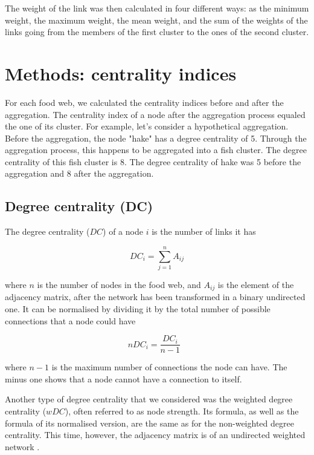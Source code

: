 	The weight of the link was then calculated in four different ways: as the minimum weight, the maximum weight, the mean weight, and the sum of the weights of the links going from the members of the first cluster to the ones of the second cluster.

\section*{Methods: centrality indices}

	For each food web, we calculated the centrality indices before and after the aggregation. The centrality index of a node after the aggregation process equaled the one of its cluster. For example, let's consider a hypothetical aggregation. Before the aggregation, the node "hake" has a degree centrality of 5. Through the  aggregation process, this happens to be aggregated into a fish cluster. The degree centrality of this fish cluster is 8. The degree centrality of hake was 5 before the aggregation and 8 after the aggregation.

	\subsection*{Degree centrality (DC)}

		The degree centrality ($DC$) of a node $i$ is the number of links it has \citep{Wasserman1994}

					\begin{equation}
								DC_i=\sum_{j=1}^{n}A_{ij}
					\end{equation}

		\noindent where $n$ is the number of nodes in the food web, and $A_{ij}$ is the element of the adjacency matrix, after the network has been transformed in a binary undirected one. It can be normalised by dividing it by the total number of possible connections that a node could have \citep{Wasserman1994}

					\begin{equation}
								nDC_i=\frac{DC_i}{n-1}\ \ \
					\end{equation}

		\noindent where $n-1$ is the maximum number of connections the node can have. The minus one shows that a node cannot have a connection to itself.

		Another type of degree centrality that we considered was the weighted degree centrality ($wDC$), often referred to as node strength. Its formula, as well as the formula of its normalised version, are the same as for the non-weighted degree centrality. This time, however, the adjacency matrix is of an undirected weighted network \citep{Fornito2016}.

